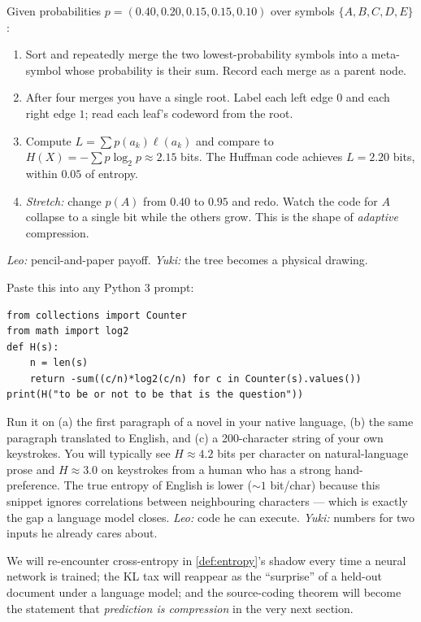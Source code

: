 \documentclass[12pt,a4paper]{article}
\theoremstyle{plain}
\theoremstyle{definition}
\begin{document}
\begin{activity}[title={Huffman-code-by-hand worksheet --- 15 minutes}]
\label{act:huffman}
Given probabilities $p = (0.40, 0.20, 0.15, 0.15, 0.10)$ over
symbols $\{A,B,C,D,E\}$:
\begin{enumerate}[leftmargin=2em,itemsep=1pt]
  \item Sort and repeatedly merge the two lowest-probability symbols
    into a meta-symbol whose probability is their sum. Record each
    merge as a parent node.
  \item After four merges you have a single root. Label each left
    edge $0$ and each right edge $1$; read each leaf's codeword
    from the root.
  \item Compute $L = \sum p(a_k) \ell(a_k)$ and compare to
    $H(X) = -\sum p \log_2 p \approx 2.15$ bits. The Huffman code
    achieves $L = 2.20$ bits, within $0.05$ of entropy.
  \item \textit{Stretch:} change $p(A)$ from $0.40$ to $0.95$ and
    redo. Watch the code for $A$ collapse to a single bit while the
    others grow. This is the shape of \emph{adaptive} compression.
\end{enumerate}
\textit{Leo:} pencil-and-paper payoff. \textit{Yuki:} the tree
becomes a physical drawing.
\end{activity}

\begin{activity}[title={Six lines of Python --- take home}]
\label{act:python}
Paste this into any Python 3 prompt:
\begin{verbatim}
from collections import Counter
from math import log2
def H(s):
    n = len(s)
    return -sum((c/n)*log2(c/n) for c in Counter(s).values())
print(H("to be or not to be that is the question"))
\end{verbatim}
Run it on (a) the first paragraph of a novel in your native
language, (b) the same paragraph translated to English, and (c) a
200-character string of your own keystrokes. You will typically see
$H \approx 4.2$ bits per character on natural-language prose and
$H \approx 3.0$ on keystrokes from a human who has a strong
hand-preference. The true entropy of English is lower
(${\sim}1$ bit/char) because this snippet ignores correlations
between neighbouring characters --- which is exactly the gap a
language model closes.
\textit{Leo:} code he can execute. \textit{Yuki:} numbers for two
inputs he already cares about.
\end{activity}

\begin{aside}[title={Forward pointer}]
We will re-encounter cross-entropy in \cref{def:entropy}'s shadow
every time a neural network is trained; the KL tax will reappear as
the ``surprise'' of a held-out document under a language model; and
the source-coding theorem will become the statement that
\emph{prediction is compression} in the very next section.
\end{aside}
\end{document}
